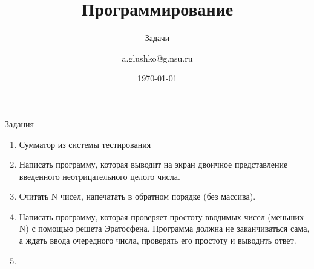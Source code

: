 \documentclass[aspectratio=169,14pt]{beamer}
\title{Программирование}
\subtitle{Задачи}
\author{a.glushko@g.nsu.ru}
\date{\today}
\begin{document}
    \begin{frame}
        \titlepage
    \end{frame}

    \begin{frame}{Задания}
        \begin{enumerate}
            \item Сумматор из системы тестирования
            \item Написать программу, которая выводит на экран двоичное представление введенного неотрицательного целого числа.
            \item Считать N чисел, напечатать в обратном порядке (без массива).
            \item Написать программу, которая проверяет простоту вводимых чисел (меньших N) с помощью решета Эратосфена.
                Программа должна не заканчиваться сама, а ждать ввода очередного числа, проверять его простоту и выводить ответ.
            \item
        \end{enumerate}
    \end{frame}
\end{document}

